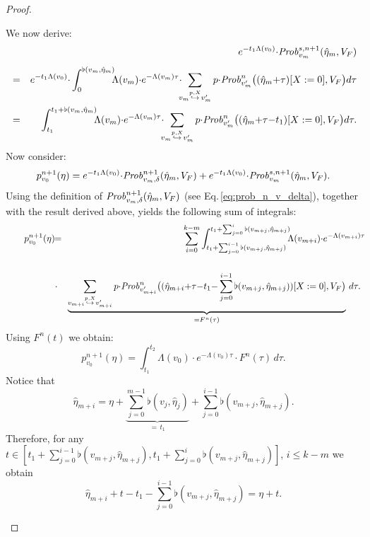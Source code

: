 \documentclass{LMCS}
\newcommand{\<}{\langle}
\renewcommand{\>}{\rangle}
\newcommand{\Prob}{{\it Prob}}
\begin{document}
\begin{proof}
\begin{enumerate}[(1)]
\noindent
We now derive:
\begin{eqnarray*}
& & e^{-t_1\Lambda(v_0)}{\cdot}\Prob^{s,n+1}_{v_m}(\hat\eta_m,V_F) \nonumber \\[1ex]
& = &e^{-t_1\Lambda(v_0)}{\cdot}\int_0^{\flat(v_m,\hat\eta_m)}
\!\!\!\Lambda(v_m){\cdot}e^{-\Lambda(v_m)\tau}{\cdot}\!\!\!\sum_{v_m\stackrel{
p,X}{\hookrightarrow}v_m'}p{\cdot}{\Prob}^{n}_{v_{m}'}
\big((\hat\eta_m{+}\tau)[X:=0],V_F \big)d\tau\nonumber\\
&=& \int_{t_1}^{t_1+\flat(v_m,\hat\eta_m)}
\!\!\!\Lambda(v_m){\cdot}e^{-\Lambda(v_m)\tau}{\cdot}\!\!\!\sum_{v_m\stackrel{
p,X}{\hookrightarrow}v_m'}p{\cdot}{\Prob}^{n}_{v_{m}'}
\big((\hat\eta_m{+}\tau{-}t_1)[X:=0],V_F \big)d\tau.
\end{eqnarray*}
Now consider:
$$
p_{v_0}^{n+1}(\eta) =
e^{-t_1\Lambda(v_0)}{\cdot}\Prob^{n+1}_{v_m,\delta}(\hat\eta_m,V_F) +
e^{-t_1\Lambda(v_0)}{\cdot}\Prob^{s,n+1}_{v_m}(\hat\eta_m,V_F).
$$
Using the definition of $\Prob^{n+1}_{v_m,\delta}(\hat\eta_m,V_F)$ (see Eq.\,\eqref{eq:prob_n_v_delta}),
together with the result derived above, yields the following sum of integrals:
\begin{eqnarray*}
\quad \quad p_{v_0}^{n+1}(\eta) & \!\! = \!\!
&\sum_{i=0}^{k-m}\int_{t_1+\sum_{j=0}^{i-1}
\flat(v_{m+j},\hat\eta_{m+j})}^{t_1+\sum_{j=0}^{i}\flat(v_{m+j},\hat\eta_{
m+j})}\!\!\!\Lambda(v_{m+i}){\cdot}e^{-\Lambda(v_{m+i})\tau}
\!\!\!\\\nonumber\\
&\cdot&
\underbrace{\sum_{v_{m+i}\stackrel{
p,X}{\hookrightarrow}v_{m+i}'}p{\cdot}{\Prob}^{n}_{v_{m+i}'}
\big((\hat\eta_{m+i}{+}\tau{-}t_1{-}\sum_{j=0}^{i-1}
\flat(v_{m+j},\hat\eta_{m+j}))[X:=0],V_F \big)}_{= F^n(\tau)} \, d\tau.
\end{eqnarray*}
Using $F^{n}(t)$ we obtain:
\begin{equation}\label{eq:genxxx}
p_{v_0}^{n+1}(\eta)=\int_{t_1}^{t_2} \Lambda(v_0){\cdot}e^{
-\Lambda(v_0)\tau}{\cdot}F^{n}(\tau) \, d\tau.
\end{equation}
Notice that
\begin{equation*}
\hat\eta_{m+i}=\eta+ \underbrace{\sum_{j=0}^{m-1}\flat(v_j,\hat\eta_j)}_{= \, t_1} +\sum_{j=0}^{i-1} \flat(v_{m+j},\hat\eta_{m+j}).
\end{equation*}
Therefore, for any
$t\in[t_1+\sum_{j=0}^{i-1}\flat(v_{m+j},\hat\eta_{m+j}),t_1+\sum_{j=0}^{i}
\flat(v_{m+j},\hat\eta_{m+j})]$, $i\leqslant k-m$ we obtain
\begin{equation*}
\hat\eta_{m+i}+t-t_1-\sum_{j=0}^{i-1}\flat(v_{m+j},\hat\eta_{m+j})=\eta+t.

\end{equation*}
\end{enumerate}
\end{proof}
\end{document}
